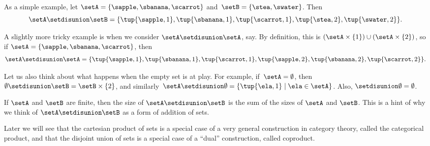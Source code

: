 As a simple example, let $\setA = \{ \sapple, \sbanana, \scarrot\}$ and~$\setB = \{ \stea, \swater \}$. Then
\begin{equation*}
    \setA \setdisunion \setB = \{ \tup{\sapple, 1}, \tup{\sbanana, 1}, \tup{\scarrot, 1}, \tup{\stea, 2},  \tup{\swater, 2}\}.
\end{equation*}

A slightly more tricky example is when we consider $\setA \setdisunion \setA$, say. By definition, this is $(\setA \times \{ 1 \}) \cup (\setA \times \{2\})$, so if $\setA = \{ \sapple, \sbanana, \scarrot\}$, then 
\begin{equation*}
\setA \setdisunion \setA = \{ \tup{\sapple, 1}, \tup{\sbanana, 1}, \tup{\scarrot, 1}, \tup{\sapple, 2}, \tup{\sbanana, 2}, \tup{\scarrot, 2} \}.
\end{equation*}


Let us also think about what happens when the empty set is at play. For example, if~$\setA = \emptyset$, then~$\emptyset \setdisunion \setB = \setB \times \{2\}$, and similarly~$\setA \setdisunion \emptyset =  \{ \tup{\ela,1} \mid \ela \in \setA \}$. Also, $\empty \setdisunion \emptyset = \emptyset$.  

\begin{remark}
If $\setA$ and $\setB$ are finite, then the size of $\setA \setdisunion \setB$ is the sum of the sizes of $\setA$ and $\setB$. This is a hint of why we think of $\setA \setdisunion \setB$ as a form of addition of sets. 
\end{remark}

Later we will see that the cartesian product of sets is a special case of a very general construction in category theory, called the categorical product, and that the disjoint union of sets is a special case of a ``dual'' construction, called coproduct.



